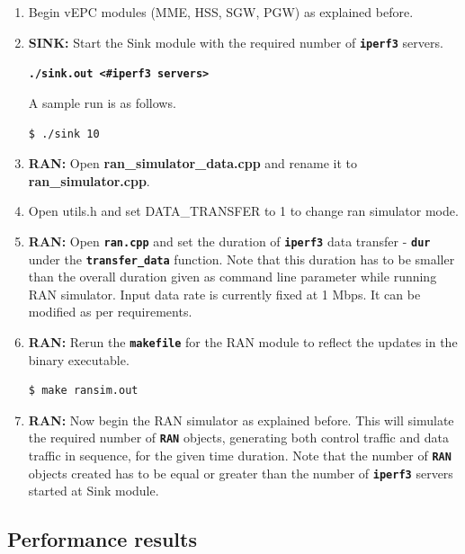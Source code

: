 \pdfminorversion=4\documentclass[hidelinks]{report}
\newcommand{\cf}[1] {
	\textbf{\texttt{#1}}
}
\begin{document}
\begin{enumerate}

\item Begin vEPC modules (MME, HSS, SGW, PGW) as explained before.

\item \textbf{SINK:} Start the Sink module with the required number of \cf{iperf3} servers.

\begin{center}

\cf{./sink.out <\#iperf3 servers>}

\end{center}

A sample run is as follows.

\begin{lstlisting}[language=bash]
$ ./sink 10
\end{lstlisting}

\item \textbf{RAN:} Open \textbf{ran\_simulator\_data.cpp} and rename it to \textbf{ran\_simulator.cpp}. 
\item Open utils.h and set DATA\_TRANSFER to 1 to change ran simulator mode.
\item \textbf{RAN:} Open \cf{ran.cpp} and set the duration of \cf{iperf3} data transfer - \cf{dur} under the \cf{transfer\_data} function. Note that this duration has to be smaller than the overall duration given as command line parameter while running RAN simulator. Input data rate is currently fixed at 1 Mbps. It can be modified as per requirements.

\item \textbf{RAN:} Rerun the \cf{makefile} for the RAN module to reflect the updates in the binary executable.

\begin{lstlisting}[language=bash]
$ make ransim.out
\end{lstlisting}

\item \textbf{RAN:} Now begin the RAN simulator as explained before. This will simulate the required number of \cf{RAN} objects, generating both control traffic and data traffic in sequence, for the given time duration. Note that the number of \cf{RAN} objects created has to be equal or greater than the number of \cf{iperf3} servers started at Sink module.

\end{enumerate}

\subsection*{Performance results}
\end{document}
